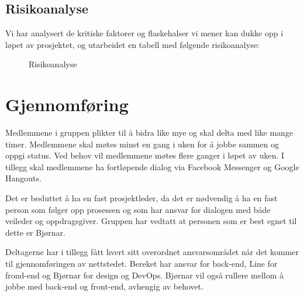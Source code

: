 \documentclass[11pt,a4paper]{report}
\begin{document}
\smallskip

\subsection*{Risikoanalyse}

Vi har analysert de kritiske faktorer og flaskehalser vi mener kan dukke opp i løpet av prosjektet, og utarbeidet en tabell med følgende risikoanalyse:

\begin{figure}[H]
    \centering
    \caption{Risikoanalyse}
    \label{fig:risikoanalyse}
\end{figure}


\section*{Gjennomføring}

Medlemmene i gruppen plikter til å bidra like mye og skal delta med like mange timer. Medlemmene skal møtes minst en gang i uken for å jobbe sammen og oppgi status. Ved behov vil medlemmene møtes flere ganger i løpet av uken. I tillegg skal medlemmene ha fortløpende dialog via Facebook Messenger og Google Hangouts.


Det er besluttet å ha en fast prosjektleder, da det er nødvendig å ha en fast person som følger opp prosessen og som har ansvar for dialogen med både veileder og oppdragsgiver. Gruppen har vedtatt at personen som er best egnet til dette er Bjørnar.

Deltagerne har i tillegg fått hvert sitt overordnet ansvarsområdet når det kommer til gjennomføringen av nettstedet. Bereket har ansvar for back-end, Line for frond-end og Bjørnar for design og DevOps. Bjørnar vil også rullere mellom å jobbe med back-end og front-end, avhengig av behovet.
\end{document}
